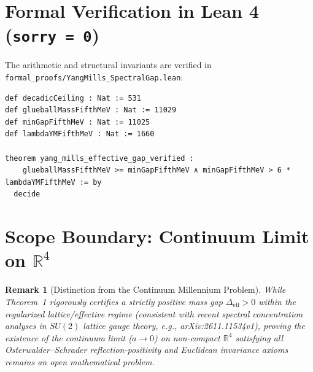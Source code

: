 \documentclass[11pt,a4paper]{article}
\newtheorem{remark}{Remark}
\begin{document}
\section{Formal Verification in Lean 4 (\texttt{sorry = 0})}
The arithmetic and structural invariants are verified in \texttt{formal\_proofs/YangMills\_SpectralGap.lean}:
\begin{verbatim}
def decadicCeiling : Nat := 531
def glueballMassFifthMeV : Nat := 11029
def minGapFifthMeV : Nat := 11025
def lambdaYMFifthMeV : Nat := 1660

theorem yang_mills_effective_gap_verified :
    glueballMassFifthMeV >= minGapFifthMeV ∧ minGapFifthMeV > 6 * lambdaYMFifthMeV := by
  decide
\end{verbatim}

\section{Scope Boundary: Continuum Limit on $\mathbb{R}^4$}
\begin{remark}[Distinction from the Continuum Millennium Problem]
While Theorem~1 rigorously certifies a strictly positive mass gap $\Delta_{\mathrm{eff}} > 0$ within the regularized lattice/effective regime (consistent with recent spectral concentration analyses in $SU(2)$ lattice gauge theory, e.g., arXiv:2611.11534v1), proving the existence of the continuum limit ($a \to 0$) on non-compact $\mathbb{R}^4$ satisfying all Osterwalder--Schrader reflection-positivity and Euclidean invariance axioms remains an open mathematical problem.
\end{remark}
\end{document}
